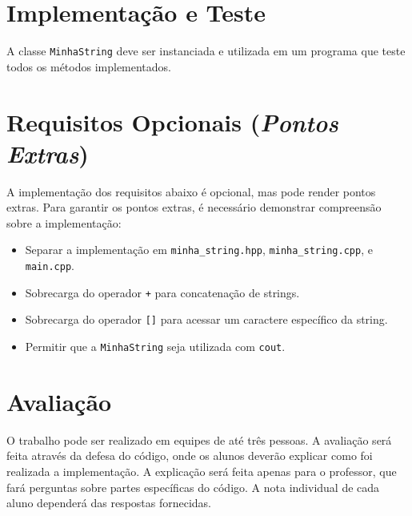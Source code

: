 \documentclass[12pt]{article}
\begin{document}
\section*{Implementação e Teste}
A classe \texttt{MinhaString} deve ser instanciada e utilizada em um programa que teste todos os métodos implementados.

\section*{Requisitos Opcionais (\emph{Pontos Extras})}
A implementação dos requisitos abaixo é opcional, mas pode render pontos extras. Para garantir os pontos extras, é necessário demonstrar compreensão sobre a implementação:
\begin{itemize}
    \item Separar a implementação em \texttt{minha\_string.hpp}, \texttt{minha\_string.cpp}, e \texttt{main.cpp}.
    \item Sobrecarga do operador \texttt{+} para concatenação de strings.
    \item Sobrecarga do operador \texttt{[]} para acessar um caractere específico da string.
    \item Permitir que a \texttt{MinhaString} seja utilizada com \texttt{cout}.
\end{itemize}

\section*{Avaliação}
O trabalho pode ser realizado em equipes de até três pessoas. A avaliação será feita através da defesa do código, onde os alunos deverão explicar como foi realizada a implementação. A explicação será feita apenas para o professor, que fará perguntas sobre partes específicas do código. A nota individual de cada aluno dependerá das respostas fornecidas.
\end{document}
